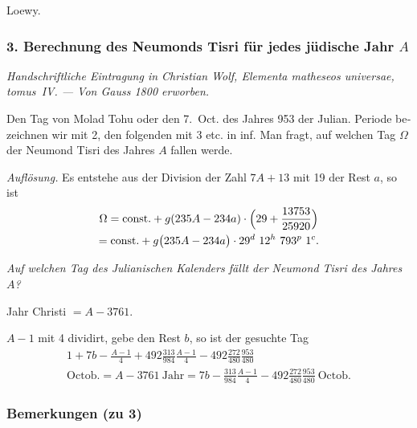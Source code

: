 \documentclass[12pt,a4paper]{article}
\theoremstyle{plain}
\theoremstyle{definition}
\theoremstyle{remark}
\begin{document}
\hfill Loewy.

\newpage

\subsubsection*{3. Berechnung des Neumonds Tisri für jedes jüdische Jahr $A$}

\textit{Handschriftliche Eintragung in Christian Wolf, Elementa matheseos universae, tomus~IV. --- Von Gauss 1800 erworben.}

\medskip

\begin{otherlanguage}{latin}
Den Tag von Molad Tohu oder den 7.~Oct. des Jahres 953 der Julian. Periode bezeichnen wir mit 2, den folgenden mit 3 etc. in inf. Man fragt, auf welchen Tag $\Omega$ der Neumond Tisri des Jahres $A$ fallen werde.

\textit{Auflösung.} Es entstehe aus der Division der Zahl $7A + 13$ mit 19 der Rest $a$, so ist
\begin{multline*}
\Omega = \text{const.} + g(235A - 234a) \cdot \Bigl(29 + \frac{13753}{25920}\Bigr) \\
= \text{const.} + g\bigl(235A - 234a\bigr) \cdot 29^d\ 12^h\ 793^p\ 1^c.
\end{multline*}
\end{otherlanguage}

\medskip

\begin{otherlanguage}{latin}
\textit{Auf welchen Tag des Julianischen Kalenders fällt der Neumond Tisri des Jahres $A$?}

Jahr Christi $= A - 3761$.

$A - 1$ mit 4 dividirt, gebe den Rest $b$, so ist der gesuchte Tag
\begin{multline*}
1 + 7b - \frac{A - 1}{4} + 492\frac{313}{984}\frac{A - 1}{4} - 492\frac{272}{480}\frac{953}{480} \\
\text{Octob.} = A - 3761\ \text{Jahr} = 7b - \frac{313}{984}\frac{A - 1}{4} - 492\frac{272}{480}\frac{953}{480}\ \text{Octob.}
\end{multline*}
\end{otherlanguage}

\newpage

\subsubsection*{Bemerkungen (zu 3)}
\end{document}
